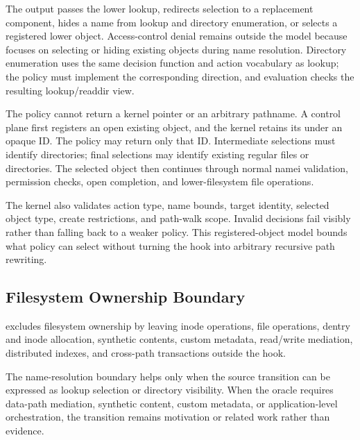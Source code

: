 The output passes the lower lookup, redirects selection to a replacement
component, hides a name from lookup and directory enumeration, or selects a
registered lower object. Access-control denial remains outside the model
because \namei focuses on selecting or hiding existing objects during name
resolution. Directory enumeration uses the same decision function and action
vocabulary as lookup; the policy must implement the corresponding direction,
and evaluation checks the resulting lookup/readdir view.

The policy cannot return a kernel pointer or an arbitrary pathname. A control
plane first registers an open existing object, and the kernel retains its
 under an opaque ID. The policy may return only that ID.
Intermediate selections must identify directories; final selections may
identify existing regular files or directories. The selected object then
continues through normal namei validation, permission checks, open completion,
and lower-filesystem file operations.

The kernel also validates action type, name bounds, target identity, selected
object type, create restrictions, and path-walk scope. Invalid decisions fail
visibly rather than falling back to a weaker policy. This registered-object
model bounds what policy can select without turning the hook into arbitrary
recursive path rewriting.

\subsection{Filesystem Ownership Boundary}

\namei excludes filesystem ownership by leaving inode operations, file
operations, dentry and inode allocation, synthetic contents, custom metadata,
read/write mediation, distributed indexes, and cross-path transactions outside
the hook.

The name-resolution boundary helps only when the source transition can
be expressed as lookup selection or directory visibility. When the oracle
requires data-path mediation, synthetic content, custom metadata, or
application-level orchestration, the transition remains motivation or related
work rather than \namei evidence.
